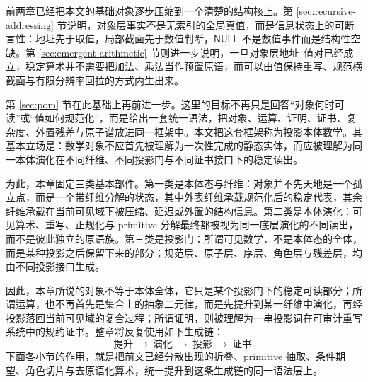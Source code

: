 前两章已经把本文的基础对象逐步压缩到一个清楚的结构核上。第 \ref{sec:recursive-addressing} 节说明，对象层事实不是无索引的全局真值，而是信息状态上的可断言性：地址先于取值，局部截面先于数值判断，\(\mathsf{NULL}\) 不是数值事件而是结构性空缺。第 \ref{sec:emergent-arithmetic} 节则进一步说明，一旦对象层地址--值对已经成立，稳定算术并不需要把加法、乘法当作预置原语，而可以由值保持重写、规范横截面与有限分辨率回拉的方式内生出来。

第 \ref{sec:pom} 节在此基础上再前进一步。这里的目标不再只是回答“对象何时可读”或“值如何规范化”，而是给出一套统一语法，把对象、运算、证明、证书、复杂度、外置残差与原子谱放进同一框架中。本文把这套框架称为投影本体数学。其基本立场是：数学对象不应首先被理解为一次性完成的静态实体，而应被理解为同一本体演化在不同纤维、不同投影门与不同证书接口下的稳定读出。

为此，本章固定三类基本部件。第一类是本体态与纤维：对象并不先天地是一个孤立点，而是一个带纤维分解的状态，其中外表纤维承载规范化后的稳定代表，其余纤维承载在当前可见域下被压缩、延迟或外置的结构信息。第二类是本体演化：可见算术、重写、正规化与 primitive 分解最终都被视为同一底层演化的不同读出，而不是彼此独立的原语族。第三类是投影门：所谓可见数学，不是本体态的全体，而是某种投影之后保留下来的部分；规范层、原子层、序层、角色层与残差层，均由不同投影接口生成。

因此，本章所说的对象不等于本体全体，它只是某个投影门下的稳定可读部分；所谓运算，也不再首先是集合上的抽象二元律，而是先提升到某一纤维中演化，再经投影落回当前可见域的复合过程；所谓证明，则被理解为一串投影词在可审计重写系统中的规约证书。整章将反复使用如下生成链：
\[
\text{提升}\ \longrightarrow\ \text{演化}\ \longrightarrow\ \text{投影}\ \longrightarrow\ \text{证书}.
\]
下面各小节的作用，就是把前文已经分散出现的折叠、primitive 抽取、条件期望、角色切片与去原语化算术，统一提升到这条生成链的同一语法层上。
